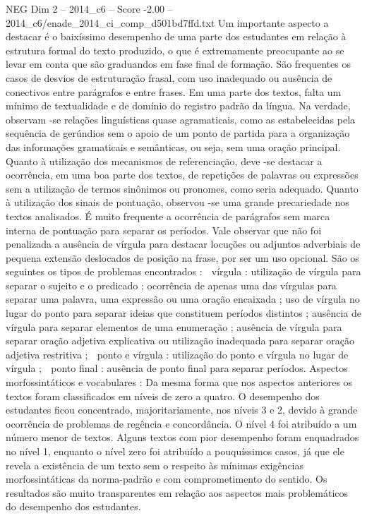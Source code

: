 \begin{textsample}{NEG Dim 2 – 2014\_c6 – Score -2.00 – 2014\_c6/enade\_2014\_ci\_comp\_d501bd7ffd.txt}
Um importante aspecto a destacar é o baixíssimo desempenho de uma parte dos estudantes em relação à estrutura formal do texto produzido, o que é extremamente preocupante ao se levar em conta que são graduandos em fase final de formação.
São frequentes os casos de desvios de estruturação frasal, com uso inadequado ou ausência de conectivos entre parágrafos e entre frases.
Em uma parte dos textos, falta um mínimo de textualidade e de domínio do registro padrão da língua.
Na verdade, observam -se relações linguísticas quase agramaticais, como as estabelecidas pela sequência de gerúndios sem o apoio de um ponto de partida para a organização das informações gramaticais e semânticas, ou seja, sem uma oração principal.
Quanto à utilização dos mecanismos de referenciação, deve -se destacar a ocorrência, em uma boa parte dos textos, de repetições de palavras ou expressões sem a utilização de termos sinônimos ou pronomes, como seria adequado.
Quanto à utilização dos sinais de pontuação, observou -se uma grande precariedade nos textos analisados.
É muito frequente a ocorrência de parágrafos sem marca interna de pontuação para separar os períodos.
Vale observar que não foi penalizada a ausência de vírgula para destacar locuções ou adjuntos adverbiais de pequena extensão deslocados de posição na frase, por ser um uso opcional.
São os seguintes os tipos de problemas encontrados :  vírgula : utilização de vírgula para separar o sujeito e o predicado ; ocorrência de apenas uma das vírgulas para separar uma palavra, uma expressão ou uma oração encaixada ; uso de vírgula no lugar do ponto para separar ideias que constituem períodos distintos ; ausência de vírgula para separar elementos de uma enumeração ; ausência de vírgula para separar oração adjetiva explicativa ou utilização inadequada para separar oração adjetiva restritiva ;  ponto e vírgula : utilização do ponto e vírgula no lugar de vírgula ;  ponto final : ausência de ponto final para separar períodos.
Aspectos morfossintáticos e vocabulares : Da mesma forma que nos aspectos anteriores os textos foram classificados em níveis de zero a quatro.
O desempenho dos estudantes ficou concentrado, majoritariamente, nos níveis 3 e 2, devido à grande ocorrência de problemas de regência e concordância.
O nível 4 foi atribuído a um número menor de textos.
Alguns textos com pior desempenho foram enquadrados no nível 1, enquanto o nível zero foi atribuído a pouquíssimos casos, já que ele revela a existência de um texto sem o respeito às mínimas exigências morfossintáticas da norma-padrão e com comprometimento do sentido.
Os resultados são muito transparentes em relação aos aspectos mais problemáticos do desempenho dos estudantes.

\end{textsample}
